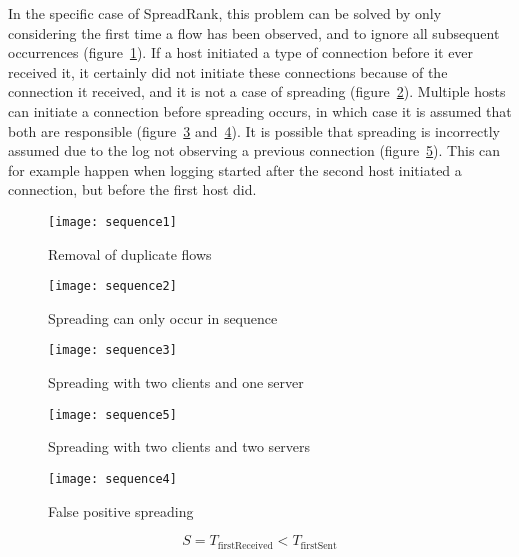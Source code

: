 In the specific case of SpreadRank, this problem can be solved by only considering the first time a flow has been observed,
 and to ignore all subsequent occurrences (figure~\ref{fig:sequence1}).
If a host initiated a type of connection before it ever received it, it certainly did not initiate these connections because of the connection it received,
 and it is not a case of spreading (figure~\ref{fig:sequence2}).
Multiple hosts can initiate a connection before spreading occurs, in which case it is assumed that both are responsible (figure~\ref{fig:sequence3} and~\ref{fig:sequence5}).
It is possible that spreading is incorrectly assumed due to the log not observing a previous connection (figure~\ref{fig:sequence4}).
This can for example happen when logging started after the second host initiated a connection, but before the first host did.

\begin{figure}[h]
	\caption{Removal of duplicate flows}
	\label{fig:sequence1}
	\centering
		\texttt{[image: sequence1]}
\end{figure}
\begin{figure}[h]
	\caption{Spreading can only occur in sequence}
	\label{fig:sequence2}
	\centering
		\texttt{[image: sequence2]}
\end{figure}
\begin{figure}[h]
	\caption{Spreading with two clients and one server}
	\label{fig:sequence3}
	\centering
		\texttt{[image: sequence3]}
\end{figure}
\begin{figure}[h]
	\caption{Spreading with two clients and two servers}
	\label{fig:sequence5}
	\centering
		\texttt{[image: sequence5]}
\end{figure}
\begin{figure}[h]
	\caption{False positive spreading}
	\label{fig:sequence4}
	\centering
		\texttt{[image: sequence4]}
\end{figure}

\begin{equation}
	\label{eq:spreading}
	S = T_{\text{firstReceived}} < T_{\text{firstSent}}
\end{equation}


